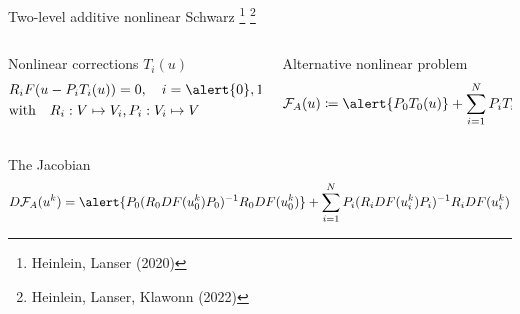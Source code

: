 \begin{frame}{Two-level additive nonlinear Schwarz \footnote{\tiny Heinlein, Lanser (2020)} \footnote{\tiny Heinlein, Lanser, Klawonn (2022)}}
	\begin{columns}
		\begin{column}{0.5\textwidth}
			\begin{block}{\normalsize Nonlinear corrections $T_i(u)$}
				\vspace*{-1mm}
				\begin{align*}
					 & R_iF(u-P_iT_i(u))  = 0, \quad i = \alert{0},1,2,\dots N      \\
					 & \text{with}\quad R_i:V\mapsto V_i\text{,}\, P_i:V_i\mapsto V
				\end{align*}
			\end{block}
		\end{column}
		\begin{column}{0.5\textwidth}
			\begin{block}{\normalsize Alternative nonlinear problem}
				\begin{equation*}
					\mathcal{F}_A(u) \coloneqq \alert{P_0T_0(u)} + \sum_{i=1}^NP_iT_i(u) = 0
				\end{equation*}
			\end{block}
		\end{column}
	\end{columns}
	\begin{block}{\normalsize The Jacobian}
		\vspace*{-2mm}
		\begin{align*}
			D\mathcal{F}_A(u^k)  = \alert{P_0(R_0DF(u_0^k)P_0)^{-1}R_0DF(u_0^k)} + \sum_{i=1}^NP_i(R_iDF(u_i^k)P_i)^{-1}R_iDF(u_i^k)
		\end{align*}
	\end{block}
\end{frame}

